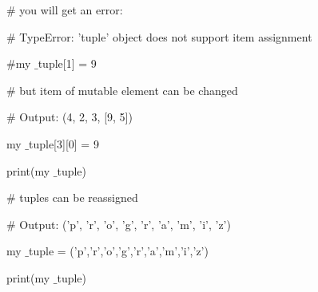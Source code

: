 \documentclass[a4paper,12pt]{report}
\begin{document}
{\fontsize{16pt}{16pt}\selectfont  $  \#  $ you will get an error: \\} \par
\noindent 
{\fontsize{16pt}{16pt}\selectfont  $  \#  $ TypeError: 'tuple' object does not support item assignment \\} \par
\vspace{16pt}
\noindent 
{\fontsize{16pt}{16pt}\selectfont  $  \#  $my $  \_  $tuple[1] = 9 \\} \par
\vspace{16pt}
\noindent 
{\fontsize{16pt}{16pt}\selectfont  $  \#  $ but item of mutable element can be changed \\} \par
\noindent 
{\fontsize{16pt}{16pt}\selectfont  $  \#  $ Output: (4, 2, 3, [9, 5]) \\} \par
\noindent 
{\fontsize{16pt}{16pt}\selectfont my $  \_  $tuple[3][0] = 9 \\} \par
\noindent 
{\fontsize{16pt}{16pt}\selectfont print(my $  \_  $tuple) \\} \par
\vspace{16pt}
\noindent 
{\fontsize{16pt}{16pt}\selectfont  $  \#  $ tuples can be reassigned \\} \par
\noindent 
{\fontsize{16pt}{16pt}\selectfont  $  \#  $ Output: ('p', 'r', 'o', 'g', 'r', 'a', 'm', 'i', 'z') \\} \par
\noindent 
{\fontsize{16pt}{16pt}\selectfont my $  \_  $tuple = ('p','r','o','g','r','a','m','i','z') \\} \par
\noindent 
{\fontsize{16pt}{16pt}\selectfont print(my $  \_  $tuple) \\} \par
\end{document}
